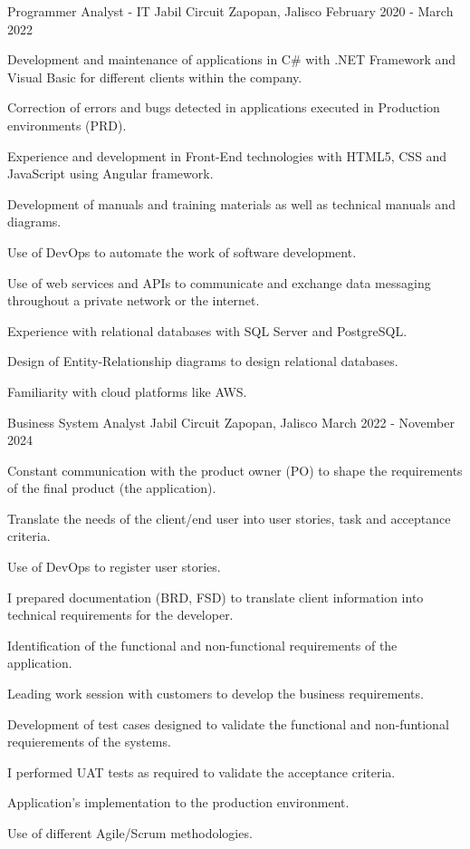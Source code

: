 \begin{cventries}
\cventry
{Programmer Analyst - IT} %
{Jabil Circuit} %
{Zapopan, Jalisco} %
{February 2020 - March 2022} %
{ %
\begin{cvitems}
\item {Development and maintenance of applications in C\# with .NET Framework and Visual Basic for different clients within the company.}
\item {Correction of errors and bugs detected in applications executed in Production environments (PRD).}
\item {Experience and development in Front-End technologies with HTML5, CSS and JavaScript using Angular framework.}
\item {Development of manuals and training materials as well as technical manuals and diagrams.}
\item {Use of DevOps to automate the work of software development.}
\item {Use of web services and APIs to communicate and exchange data messaging throughout a private network or the internet.}
\item {Experience with relational databases with SQL Server and PostgreSQL.}
\item {Design of Entity-Relationship diagrams to design relational databases.}
\item {Familiarity with cloud platforms like AWS.}
\end{cvitems}
}


\cventry
{Business System Analyst} %
{Jabil Circuit} %
{Zapopan, Jalisco} %
{March 2022 - November 2024} %
{ %
\begin{cvitems}
\item {Constant communication with the product owner (PO) to shape the requirements of the final product (the application).}
\item {Translate the needs of the client/end user into user stories, task and acceptance criteria.}
\item {Use of DevOps to register user stories.}
\item {I prepared documentation (BRD, FSD) to translate client information into technical requirements for the developer.}
\item {Identification of the functional and non-functional requirements of the application.}
\item{Leading work session with customers to develop the business requirements.}
\item {Development of test cases designed to validate the functional and non-funtional requierements of the systems.}
\item {I performed UAT tests as required to validate the acceptance criteria.}
\item {Application's implementation to the production environment.}
\item{Use of different Agile/Scrum methodologies.}
\end{cvitems} 
}




\end{cventries}